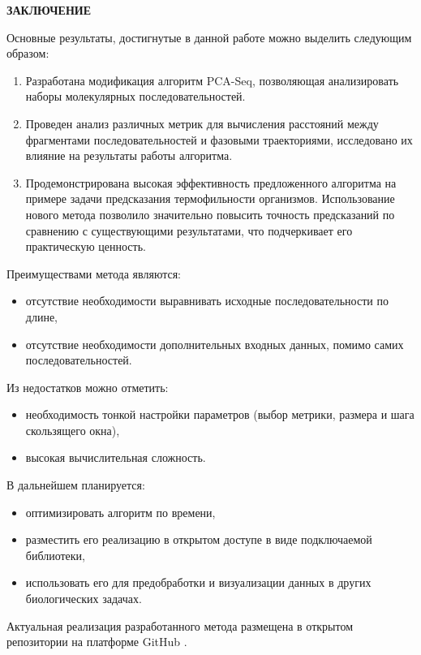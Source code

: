 \newpage
\begin{center}
  \textbf{\large ЗАКЛЮЧЕНИЕ}
\end{center}

Основные результаты, достигнутые в данной работе можно выделить следующим образом:

\begin{enumerate}
  \item Разработана модификация алгоритм PCA-Seq, позволяющая анализировать наборы молекулярных последовательностей.
  \item Проведен анализ различных метрик для вычисления расстояний между фрагментами последовательностей и фазовыми траекториями, исследовано их влияние на результаты работы алгоритма.
  \item Продемонстрирована высокая эффективность предложенного алгоритма на примере задачи предсказания термофильности организмов. Использование нового метода позволило значительно повысить точность предсказаний по сравнению с существующими результатами, что подчеркивает его практическую ценность.
\end{enumerate}

Преимуществами метода являются:

\begin{itemize}
  \item отсутствие необходимости выравнивать исходные последовательности по длине,
  \item отсутствие необходимости дополнительных входных данных, помимо самих последовательностей.
\end{itemize}

Из недостатков можно отметить:

\begin{itemize}
  \item необходимость тонкой настройки параметров (выбор метрики, размера и шага скользящего окна),
  \item высокая вычислительная сложность.
\end{itemize}

В дальнейшем планируется:
\begin{itemize}
  \item оптимизировать алгоритм по времени,
  \item разместить его реализацию в открытом доступе в виде подключаемой библиотеки,
  \item использовать его для предобработки и визуализации данных в других биологических задачах.
\end{itemize}

Актуальная реализация разработанного метода размещена в открытом репозитории на платформе GitHub \cite{github}.
